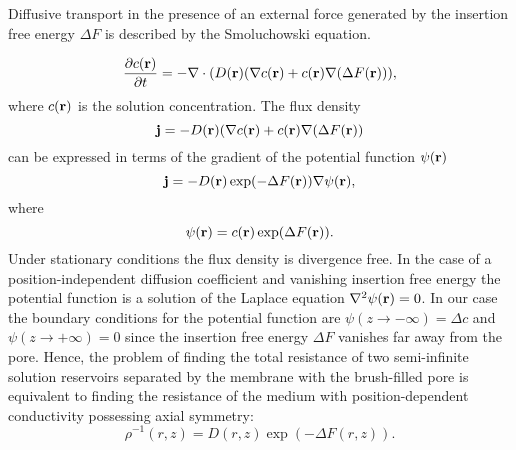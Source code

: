 \documentclass[12pt, a4paper]{article}
\begin{document}

Diffusive transport in the presence of an external force generated by the insertion free energy $\Delta F$ is described by the Smoluchowski equation.

\begin{equation}
    \frac{\partial c(\bold r)}{\partial t}=-{\bold \nabla}\cdot (D(\bold r)({\bold \nabla}c({\bold r})+c({\bold r}){\bold \nabla}(\Delta F({\bold  r}))),
    \label{eq:Smoluch}
\end{equation}
where $c(\bold r)$ is the solution concentration. The flux density 
\begin{equation}
    \bold j=- D(\bold r)({\bold \nabla}c({\bold r})+c({\bold r}){\bold \nabla}(\Delta F({\bold  r}))
    \label{eq:j}
\end{equation}
can be expressed in terms of the gradient of the potential function $\psi(\bold r)$
\begin{equation}
    \bold j=- D(\bold r) \exp(-\Delta F({\bold  r}))  {\bold \nabla} \psi(\bold r),
    \label{eq:psi}
\end{equation}
where
\begin{equation}
    \psi(\bold r)=c(\bold r)\exp(\Delta F(\bold r)).
    \label{eq:psi1}
\end{equation}
Under stationary conditions the flux density is divergence free. In the case of a position-independent diffusion coefficient and vanishing insertion free energy the potential function is a solution of the Laplace equation $\nabla^2 \psi(\bold r)=0$.
In our case the boundary conditions for the potential function are $\psi(z\rightarrow -\infty)=\Delta c$ and $\psi(z\rightarrow +\infty)=0$ since the insertion free energy $\Delta F$ vanishes far away from the pore.
Hence, the problem of finding the total resistance of two semi-infinite solution reservoirs separated by the membrane with the brush-filled pore is equivalent to finding the resistance of the medium with position-dependent conductivity possessing axial symmetry:
\begin{equation}
    \rho^{-1} (r,z)= D(r,z)\exp(-\Delta F(r,z)).
    \label{eq:rho}
\end{equation}

\end{document}
